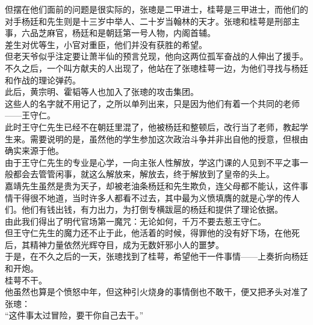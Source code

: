 \begin{multicols}{\theparacolNo}
但摆在他们面前的问题是很实际的，张璁是二甲进士，桂萼是三甲进士，而他们的对手杨廷和先生则是十三岁中举人、二十岁当翰林的天才。张璁和桂萼是刑部主事，六品芝麻官，杨廷和是朝廷第一号人物，内阁首辅。\\

差生对优等生，小官对重臣，他们并没有获胜的希望。\\

但老天爷似乎注定要让萧半仙的预言兑现，他向这两位孤军奋战的人伸出了援手。\\

不久之后，一个叫方献夫的人出现了，他站在了张璁桂萼一边，为他们寻找与杨廷和作战的理论弹药。\\

此后，黄宗明、霍韬等人也加入了张璁的攻击集团。\\

这些人的名字就不用记了，之所以单列出来，只是因为他们有着一个共同的老师——王守仁。\\

此时王守仁先生已经不在朝廷里混了，他被杨廷和整顿后，改行当了老师，教起学生来。需要说明的是，虽然他的学生参加这次政治斗争并非出自他的授意，但根由确实来源于他。\\

由于王守仁先生的专业是心学，一向主张人性解放，学这门课的人见到不平之事一般都会去管管闲事，就这么解放来，解放去，终于解放到了皇帝的头上。\\

嘉靖先生虽然是贵为天子，却被老油条杨廷和先生欺负，连父母都不能认，这件事情干得很不地道，当时许多人都看不过去，其中最为义愤填膺的就是心学的传人们。他们有钱出钱，有力出力，为打倒专横跋扈的杨廷和提供了理论依据。\\

由此我们得出了明代官场第一魔咒：无论如何，千万不要去惹王守仁。\\

但王守仁先生的魔力还不止于此，他活着的时候，得罪他的没有好下场，在他死后，其精神力量依然光辉夺目，成为无数奸邪小人的噩梦。\\

于是，在不久之后的一天，张璁找到了桂萼，希望他干一件事情——上奏折向杨廷和开炮。\\

桂萼不干。\\

他虽然也算是个愤怒中年，但这种引火烧身的事情倒也不敢干，便又把矛头对准了张璁：\\

“这件事太过冒险，要干你自己去干。”\\


\end{multicols}
